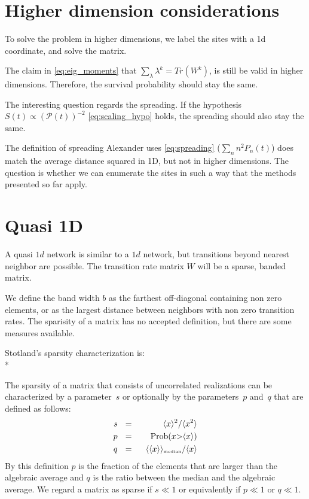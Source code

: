 \documentclass[onecolumn,fleqn]{revtex4}
\newcommand{\tbox}[1]{\mbox{\tiny #1}}
\newenvironment{fminipage}%
  {\begin{Sbox}\begin{minipage}}%
  {\end{minipage}\end{Sbox}\fbox{\TheSbox}}
\begin{document}
\section{Higher dimension considerations}
To solve the problem in higher dimensions, we label the sites with a 1d coordinate, and solve the matrix.

The claim in \eqref{eq:eig_moments} that $\sum_\lambda \lambda^k = Tr (W^k)$, is still be valid in higher dimensions. Therefore, the survival probability should stay the same.

The interesting question regards the spreading. If the hypothesis $S(t) \propto \left(\mathcal{P}(t)\right)^{-2}$ \eqref{eq:scaling_hypo} holds, the spreading should also stay the same. 

The definition of spreading Alexander uses \eqref{eq:spreading} ($\sum_n n^2 P_n(t)$) does match the average distance squared in 1D, but not in higher dimensions. The question is whether we can enumerate the sites in such a way that the methods presented so far apply.

\section{Quasi 1D}\label{sec:quasi1d}
A quasi $1d$ network is similar to a $1d$ network, but transitions beyond nearest neighbor are possible. The transition rate matrix $W$ will be a sparse, banded matrix. 

We define the band width $b$ as the farthest off-diagonal containing non zero elements, or as the largest distance between neighbors with non zero transition rates. The sparisity of a matrix has no accepted definition, but there are some measures available.


Stotland's \cite{Stotland:2010:PRB}  sparsity characterization is:\\*
\begin{fminipage}{\textwidth}
The sparsity of a matrix that consists of 
uncorrelated realizations can be characterized 
by a parameter~$s$ or optionally 
by the parameters~$p$ and~$q$ that 
are defined as follows: 
%
\begin{align*}
s \ \ &=& \ \ \langle x \rangle^2 / \langle x^2 \rangle \\
p \ \ &=& \ \ \mbox{Prob}(x {>} \langle x\rangle) \\
q \ \ &=& \ \ \langle\langle x \rangle\rangle_{\tbox{median}}/\langle x \rangle
\end{align*}
%
By this definition $p$ is the fraction of the elements that 
are larger than the algebraic average and $q$ is the ratio between the median
and the algebraic average.
We regard a matrix as sparse if $s\ll1$  
or equivalently if $p \ll 1$ or $q \ll 1$. 

\end{fminipage}
\\
\end{document}
